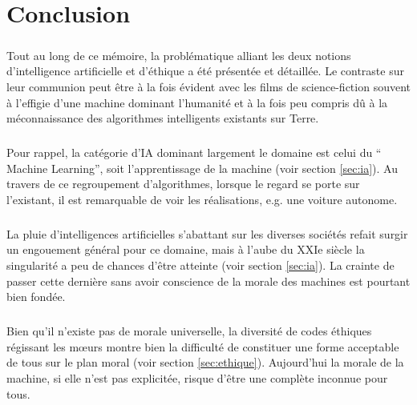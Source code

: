 \documentclass[10pt, french, a4paper]{report}
\begin{document}

\newpage
\chapter*{Conclusion}

\paragraph{}
Tout au long de ce mémoire, la problématique alliant les deux notions d’intelligence artificielle et d’éthique a été présentée et détaillée. Le contraste sur leur communion peut être à la fois évident avec les films de science-fiction souvent à l’effigie d’une machine dominant l’humanité et à la fois peu compris dû à la méconnaissance des algorithmes intelligents existants sur Terre.

\paragraph{}
Pour rappel, la catégorie d’IA dominant largement le domaine est celui du `` Machine Learning'', soit l’apprentissage de la machine (voir section \ref{sec:ia}). Au travers de ce regroupement d’algorithmes, lorsque le regard se porte sur l’existant, il est remarquable de voir les réalisations, e.g. une voiture autonome.

\paragraph{}
La pluie d’intelligences artificielles s’abattant sur les diverses sociétés refait surgir un engouement général pour ce domaine, mais à l’aube du XXIe siècle la singularité a peu de chances d’être atteinte (voir section \ref{sec:ia}). La crainte de passer cette dernière sans avoir conscience de la morale des machines est pourtant bien fondée.

\paragraph{}
Bien qu’il n’existe pas de morale universelle, la diversité de codes éthiques régissant les mœurs montre bien la difficulté de constituer une forme acceptable de tous sur le plan moral (voir section \ref{sec:ethique}). Aujourd’hui la morale de la machine, si elle n’est pas explicitée, risque d’être une complète inconnue pour tous.
\end{document}
